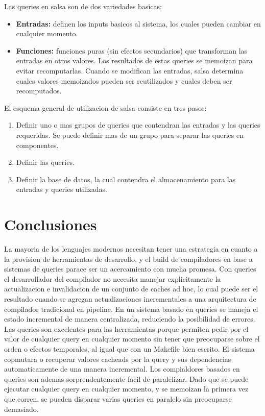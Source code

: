 \documentclass[12pt, a4paper]{report}
\begin{document}
    Las queries en salsa son de dos variedades basicas:
    \begin{itemize}[noitemsep]
    \item \textbf{Entradas:}
    definen los inputs basicos al sistema, los cuales pueden cambiar en cualquier momento.
    \item \textbf{Funciones:}
    funciones puras (sin efectos secundarios) que transforman las entradas en otros valores.
    Los resultados de estas queries se memoizan para evitar recomputarlas.
    Cuando se modifican las entradas, salsa determina cuales valores memoizados pueden ser reutilizados y cuales deben ser recomputados.
    \end{itemize}

    El esquema general de utilizacion de salsa consiste en tres pasos:

    \begin{enumerate}[noitemsep]
    \item Definir uno o mas grupos de queries que contendran las entradas y las queries requeridas.
    Se puede definir mas de un grupo para separar las queries en componentes.
    \item Definir las queries.
    \item Definir la base de datos, la cual contendra el almacenamiento para las entradas y queries utilizadas.
    \end{enumerate}

\chapter*{Conclusiones}

  La mayoria de los lenguajes modernos necesitan tener una estrategia en cuanto a la provision de herramientas de desarrollo, y el build de compiladores en base a sistemas de queries parace ser un acercamiento con mucha promesa.
  Con queries el desarrollador del compilador no necesita manejar explicitamente la actualizacion e invalidacion de un conjunto de caches ad hoc, lo cual puede ser el resultado cuando se agregan actualizaciones incrementales a una arquitectura de compilador tradicional en pipeline.
  En un sistema basado en queries se maneja el estado incremental de manera centralizada, reduciendo la posibilidad de errores.
  Las queries son excelentes para las herramientas porque permiten pedir por el valor de cualquier query en cualquier momento sin tener que preocuparse sobre el orden o efectos temporales, al igual que con un Makefile bien escrito.
  El sistema copmutara o recuperar valores cacheads por la query y sus dependencias automaticamente de una manera incremental.
  Los compialdores basados en queries son ademas sorprendentemente facil de paralelizar.
  Dado que se puede ejecutar cualquier query en cualquier momento, y se memoizan la primera vez que corren, se pueden disparar varias queries en paralelo sin preocuparse demasiado.
  \cite{olle_query_based}
\end{document}

